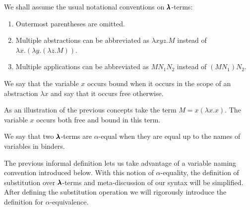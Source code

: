 \begin{notation}
  We shall assume the usual notational conventions on $\pmb{\lambda}$-terms:

  \begin{enumerate}
  \item Outermost parentheses are omitted.
  \item Multiple abstractions can be abbreviated as $\lambda x y z . M$ instead of  $\lambda x . (\lambda y . (\lambda z . M))$.
  \item Multiple applications can be abbreviated as $M N_1 N_2$ instead of $(M N_1) N_2$.
  \end{enumerate}
\end{notation}

\begin{comment}
\begin{definition}[Free variables]
  For every $\Lam$-term $M$, we recursively define the set of free variables in $M$, $FV(M)$, as follows:  
  \begin{align*}
    & FV( x ) = \{ x \}, \\
    & FV( \lambda x . M ) = FV(M) - \{ x \}, \\
    & FV( M N ) = FV(M) \cup FV(N).
  \end{align*}
\end{definition}
\end{comment}

\begin{definition}
  We say that the variable $x$ occurs bound when it occurs in the scope of an abstraction $\lambda x$ and say that it occurs free otherwise.
\end{definition}

As an illustration of the previous concepts take the term $M = x (\lambda x . x)$.
The variable $x$ occurs both free and bound in this term.

\begin{definition}
  We say that two $\pmb{\lambda}$-terms are $\alpha$-equal when they are equal up to the names of variables in binders.
\end{definition}

\begin{remark}
  The previous informal definition lets us take advantage of a variable naming convention introduced below.
  With this notion of $\alpha$-equality, the definition of substitution over $\pmb{\lambda}$-terms and meta-discussion of our syntax will be simplified.
  After defining the substitution operation we will rigorously introduce the definition for $\alpha$-equivalence.
\end{remark}

